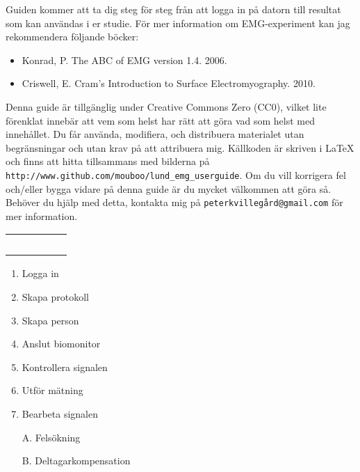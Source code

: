 \documentclass[10pt,a4paper]{article}
\newcommand{\pagetitle}[2] {
	\begin{tabularx}{\linewidth}{>{\columncolor{darkpurple}}c >{\columncolor{lightpurple!35}}X}
		\LARGE \textcolor{white}{{#1}} & \LARGE {#2} \\[3pt]
	\end{tabularx}
}
\begin{document}
Guiden kommer att ta dig steg för steg från att logga in på datorn till resultat som kan användas i er studie. För mer information om EMG-experiment kan jag rekommendera följande böcker:
\begin{itemize}
	\item Konrad, P. The ABC of EMG version 1.4. 2006.
	\item Criswell, E. Cram's Introduction to Surface Electromyography. 2010.
\end{itemize}

Denna guide är tillgänglig under Creative Commons Zero (CC0), vilket lite förenklat innebär att vem som helst har rätt att göra vad som helst med innehållet. Du får använda, modifiera, och distribuera materialet utan begränsningar och utan krav på att attribuera mig. Källkoden är skriven i \LaTeX{} och finns att hitta tillsammans med bilderna på \verb|http://www.github.com/mouboo/lund_emg_userguide|. Om du vill korrigera fel och/eller bygga vidare på denna guide är du mycket välkommen att göra så. Behöver du hjälp med detta, kontakta mig på \verb|peterkvillegård@gmail.com| för mer information.

\newpage


\pagetitle{Innehåll}{}\par
\vspace{3em}
{\Large

\begin{enumerate}[label={\Roman*.},align=right]
\item Logga in 
\item Skapa protokoll 
\item Skapa person 
\item Anslut biomonitor 
\item Kontrollera signalen 
\item Utför mätning 
\item Bearbeta signalen 
\item[A.] Felsökning 
\item[B.] Deltagarkompensation  
\end{enumerate}
}

\newpage
{}

\end{document}
